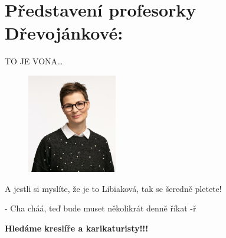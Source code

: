 \documentclass[twoside, 11pt]{article}
\begin{document}
\section*{Představení profesorky Dřevojánkové:}
TO JE VONA\dots \\
\begin{figure}
    \vspace*{-40pt}
    \includegraphics[width=0.35\textwidth]{libiak}
\end{figure}

A jestli si myslíte, že je to Libiaková, tak se šeredně pletete!
\vfill
\begin{flushright}
    - Cha cháá, teď bude muset několikrát denně říkat -ř  
\end{flushright}

\clearpage

\begin{center}
    \Large \textbf{Hledáme kreslíře a karikaturisty!!!}
\end{center}
\end{document}
